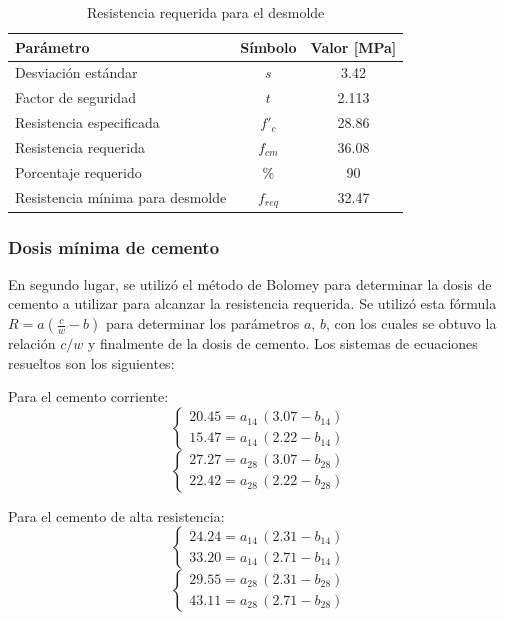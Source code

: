 \begin{table}[H]
\centering
\caption{Resistencia requerida para el desmolde}
\begin{tabular}{lcc}
\hline
Parámetro & Símbolo & Valor [MPa] \\ \hline
Desviación estándar & $s$ & 3.42 \\
Factor de seguridad & $t$ & 2.113 \\
Resistencia especificada & $f'_c$ & 28.86 \\
Resistencia requerida & $f_{cm}$ & 36.08 \\
Porcentaje requerido & \% & 90 \\
Resistencia mínima para desmolde & $f_{req}$ & 32.47 \\ \hline
\end{tabular}
\end{table}

\subsubsection*{Dosis mínima de cemento}

En segundo lugar, se utilizó el método de Bolomey para determinar la dosis de cemento a utilizar para alcanzar la resistencia requerida. Se utilizó esta fórmula $R = a(\frac{c}{w} - b)$ para determinar los parámetros $a$, $b$, con los cuales se obtuvo la relación $c/w$ y finalmente de la dosis de cemento. Los sistemas de ecuaciones resueltos son los siguientes:

Para el cemento corriente:
\[
\begin{cases}
20.45 = a_{14}\,(3.07 - b_{14}) \\
15.47 = a_{14}\,(2.22 - b_{14})
\end{cases}
\]
\[
\begin{cases}
27.27 = a_{28}\,(3.07 - b_{28}) \\
22.42 = a_{28}\,(2.22 - b_{28})
\end{cases}
\]

Para el cemento de alta resistencia:
\[
\begin{cases}
24.24 = a_{14}\,(2.31 - b_{14}) \\
33.20 = a_{14}\,(2.71 - b_{14})
\end{cases}
\]
\[
\begin{cases}
29.55 = a_{28}\,(2.31 - b_{28}) \\
43.11 = a_{28}\,(2.71 - b_{28})
\end{cases}
\]

